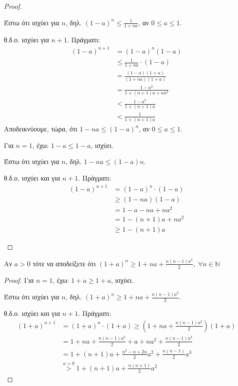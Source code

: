 \documentclass[a4paper,table]{report}
\begin{document}
\begin{multicols}{2}
\begin{enumerate}
\begin{proof}
\begin{enumerate}
          Έστω ότι ισχύει για $n$, δηλ. $ (1-a)^{n} \leq
          \frac{1}{1+na} $, αν $ 0 \leq a \leq 1 $.

          θ.δ.ο. ισχύει για $ n+1 $. Πράγματι: 
          \begin{align*}
            (1-a)^{n+1} &= (1-a)^{n}(1-a) \\
                        &\leq \frac{1}{1+na} \cdot (1-a) \\
                        &= \frac{(1-a)(1+a)}{(1+na)(1+a)} \\
                        &= \frac{1-a^{2}}{1+(n+1)a +na^{2}} \\
                        &< \frac{1-a^{2}}{1 + (n+1)a} \\
                        &< \frac{1}{1 + (n+1)a} 
          \end{align*}
          Αποδεικνύουμε, τώρα, ότι $ 1-na \leq (1-a)^{n} $, αν 
          $ 0 \leq a \leq 1 $. 

          Για $ n=1 $, έχω: $ 1-a \leq 1-a $, ισχύει.

          Έστω ότι ισχύει για $n$, δηλ. $ 1-na \leq (1-a){n} $.

          θ.δ.ο. ισχύει και για $ n+1 $. Πράγματι:
          \begin{align*}
            (1-a)^{n+1}&=(1-a)^{n}\cdot (1-a) \\
                       &\geq (1-na)(1-a) \\
                       &=1-a-na+na^{2} \\
                       &= 1-(n+1)a + na^{2} \\
                       &\geq 1-(n+1)a
          \end{align*}
      \end{enumerate}
    \end{proof}

  \item \textcolor{Col1}{Αν $a > 0$ τότε να αποδείξετε ότι $ (1+a)^{n} 
    \geq 1 + na + \frac{n(n-1)a^{2}}{2},\; \forall n \in \mathbb{N}$}
    \begin{proof}
    \item {}
      Για $ n=1 $, έχω: $ 1+a \geq 1+a $, ισχύει.

      Έστω ότι ισχύει για $n$, δηλ. $ (1+a)^{n} \geq 1+na +
      \frac{n(n-1)a^{2}}{2} $.

      θ.δ.ο. ισχύει και για $ n+1 $. Πράγματι:
      \begin{align*}
        (1+a)^{n+1} &= (1+a)^{n}\cdot (1+a) \geq (1+na+ 
        \frac{n(n-1)a^{2}}{2})(1+a) \\
                    &= 1+na+ \frac{n(n-1)a^{2}}{2} + a + na^{2} + 
                    \frac{n(n-1)a^{3}}{2} \\
                    &= 1+(n+1)a+ \frac{n^{2}-n+2n}{2} a^{2} + 
                    \frac{n(n-1)}{2} a^{3} \\
                    &\overset{a>0}{>} 1+(n+1)a + \frac{n(n+1)}{2} a^{2}
      \end{align*}
    \end{proof}


\end{enumerate}
\end{multicols}
\end{document}
